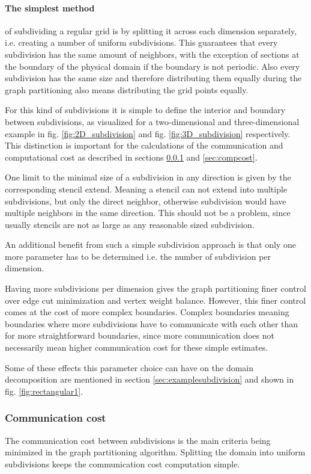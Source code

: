 \paragraph{The simplest method}of subdividing a regular grid is by splitting it across each dimension separately, i.e. creating a number of uniform subdivisions.
This guarantees that every subdivision has the same amount of neighbors, with the exception of sections at the boundary of the physical domain if the boundary is not periodic.
Also every subdivision has the same size and therefore distributing them equally during the graph partitioning also means distributing the grid points equally.

For this kind of subdivisions it is simple to define the interior and boundary between subdivisions, as visualized for a two-dimensional and three-dimensional example in fig. \ref{fig:2D_subdivision} and fig. \ref{fig:3D_subdivision} respectively.
This distinction is important for the calculations of the communication and computational cost as described in sections \ref{sec:commcost} and \ref{sec:compcost}.

One limit to the minimal size of a subdivision in any direction is given by the corresponding stencil extend.
Meaning a stencil can not extend into multiple subdivisions, but only the direct neighbor, otherwise subdivision would have multiple neighbors in the same direction.
This should not be a problem, since usually stencils are not as large as any reasonable sized subdivision.

An additional benefit from such a simple subdivision approach is that only one more parameter has to be determined i.e. the number of subdivision per dimension.

Having more subdivisions per dimension gives the graph partitioning finer control over edge cut minimization and vertex weight balance.
However, this finer control comes at the cost of more complex boundaries.
Complex boundaries meaning boundaries where more subdivisions have to communicate with each other than for more straightforward boundaries, since more communication does not necessarily mean higher communication cost for these simple estimates.

Some of these effects this parameter choice can have on the domain decomposition are mentioned in section \ref{sec:examplesubdivision} and shown in fig. \ref{fig:rectangular1}.

\subsubsection{Communication cost}
\label{sec:commcost}
The communication cost between subdivisions is the main criteria being minimized in the graph partitioning algorithm.
Splitting the domain into uniform subdivisions keeps the communication cost computation simple.

